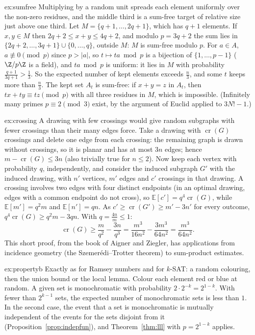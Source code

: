 \begin{solution}{ex:sumfree}
\idea Multiplying by a random unit spreads each element uniformly over the non-zero residues, and the middle third is a
sum-free target of relative size just above one third.
\writeup Let $M=\{q+1,\dots,2q+1\}$, which has $q+1$ elements. If $x,y\in M$ then $2q+2\le x+y\le4q+2$, and modulo $p=3q+2$ the sum lies in $\{2q+2,\dots,3q+1\}\cup\{0,\dots,q\}$, outside $M$:
$M$ is sum-free modulo $p$. For $a\in A$, $a\not\equiv0\pmod p$ since $p>|a|$, so $t\mapsto ta\bmod p$ is a bijection of $\{1,\dots,p-1\}$ ($\Z/p\Z$ is a field), and $ta\bmod p$ is uniform: it lies in
$M$ with probability $\frac{q+1}{3q+1}>\frac13$. So the expected number of kept elements exceeds $\frac n3$, and some $t$ keeps more than $\frac n3$. The kept set $A_t$ is
sum-free: if $x+y=z$ in $A_t$, then $tx+ty\equiv tz\pmod p$ with all three residues in $M$, which is impossible. (Infinitely many primes $p\equiv2\pmod3$ exist, by
the argument of Euclid applied to $3N!-1$.)
\end{solution}

\begin{solution}{ex:crossing}
\idea A drawing with few crossings would give random subgraphs with fewer crossings than their many edges force.
\writeup Take a drawing with $\operatorname{cr}(G)$ crossings and delete one edge from each crossing: the remaining graph is drawn without crossings, so it is
planar and has at most $3n$ edges; hence $m-\operatorname{cr}(G)\le3n$ (also trivially true for $n\le2$). Now keep each vertex with probability $q$, independently, and consider the
induced subgraph $G'$ with the induced drawing, with $n'$ vertices, $m'$ edges and $c'$ crossings in that drawing. A crossing involves two edges with four
distinct endpoints (in an optimal drawing, edges with a common endpoint do not cross), so $\mathbb E[c']=q^4\operatorname{cr}(G)$, while $\mathbb E[m']=q^2m$ and $\mathbb E[n']=qn$. As $c'\ge\operatorname{cr}(G')\ge m'-3n'$ for
every outcome, $q^4\operatorname{cr}(G)\ge q^2m-3qn$. With $q=\frac{4n}m\le1$:
\[
\operatorname{cr}(G)\ge\frac m{q^2}-\frac{3n}{q^3}=\frac{m^3}{16n^2}-\frac{3m^3}{64n^2}=\frac{m^3}{64n^2}.
\]
This short proof, from the book of Aigner and Ziegler, has applications from incidence geometry (the Szemer\'edi--Trotter
theorem) to sum-product estimates.
\end{solution}

\begin{solution}{ex:propertyb}
\idea Exactly as for Ramsey numbers and for $k$-SAT: a random colouring, then the union bound or the local lemma.
\writeup Colour each element red or blue at random. A given set is monochromatic with probability $2\cdot2^{-k}=2^{1-k}$. With fewer than $2^{k-1}$ sets, the expected
number of monochromatic sets is less than $1$. In the second case, the event that a set is monochromatic is mutually independent of the
events for the sets disjoint from it (Proposition~\ref{prop:indepfun}), and Theorem~\ref{thm:lll} with $p=2^{1-k}$ applies.
\end{solution}

